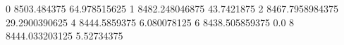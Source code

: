 0 8503.484375 64.978515625
1 8482.248046875 43.7421875
2 8467.7958984375 29.2900390625
4 8444.5859375 6.080078125
6 8438.505859375 0.0
8 8444.033203125 5.52734375
